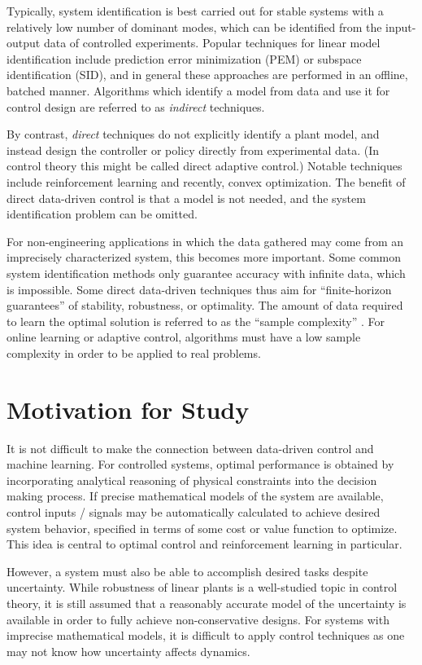Typically, system identification is best carried out for stable systems with a relatively low number of dominant modes, which can be identified from the input-output data of controlled experiments.  Popular techniques for linear model identification include prediction error minimization (PEM) or subspace identification (SID), and in general these approaches are performed in an offline, batched manner.  Algorithms which identify a model from data and use it for control design are referred to as \emph{indirect} techniques.

By contrast, \emph{direct} techniques do not explicitly identify a plant model, and instead design the controller or policy directly from experimental data.  (In control theory this might be called direct adaptive control.)  Notable techniques include reinforcement learning and recently, convex optimization.  The benefit of direct data-driven control is that a model is not needed, and the system identification problem can be omitted.

For non-engineering applications in which the data gathered may come from an imprecisely characterized system, this becomes more important.  Some common system identification methods only guarantee accuracy with infinite data, which is impossible.  Some direct data-driven techniques thus aim for ``finite-horizon guarantees'' of stability, robustness, or optimality.  The amount of data required to learn the optimal solution is referred to as the ``sample complexity'' \cite{jedra2019sample, dean2020sample, zhang2021derivative}.  For online learning or adaptive control, algorithms must have a low sample complexity in order to be applied to real problems.

\section{Motivation for Study}
\label{chap:introMotivationForStudy}
It is not difficult to make the connection between data-driven control and machine learning.  For controlled systems, optimal performance is obtained by incorporating analytical reasoning of physical constraints into the decision making process.  If precise mathematical models of the system are available, control inputs / signals may be automatically calculated to achieve desired system behavior, specified in terms of some cost or value function to optimize.  This idea is central to optimal control and reinforcement learning in particular.

However, a system must also be able to accomplish desired tasks despite uncertainty.  While robustness of linear plants is a well-studied topic in control theory, it is still assumed that a reasonably accurate model of the uncertainty is available in order to fully achieve non-conservative designs.  For systems with imprecise mathematical models, it is difficult to apply control techniques as one may not know how uncertainty affects dynamics.

